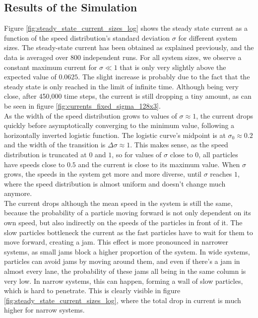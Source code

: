 \subsection{Results of the Simulation}
\label{sec:results_simulation_current_sigma_size}
Figure \ref{fig:steady_state_current_sizes_log} shows the steady state current as a function of the speed distribution's standard deviation $\sigma$ for different system sizes. The steady-state current has been obtained as explained previously, and the data is averaged over 800 independent runs. For all system sizes, we observe a constant maximum current for $\sigma \ll 1$ that is only very slightly above the expected value of $0.0625$. The slight increase is probably due to the fact that the steady state is only reached in the limit of infinite time. Although being very close, after 450,000 time steps, the current is still dropping a tiny amount, as can be seen in figure \ref{fig:currents_fixed_sigma_128x3}. 
\\
As the width of the speed distribution grows to values of $\sigma \approx 1$, the current drops quickly before asymptotically converging to the minimum value, following a horizontally inverted logistic function. The logistic curve's midpoint is at $\sigma_0 \approx 0.2$ and the width of the transition is $\Delta \sigma \approx 1$. This makes sense, as the speed distribution is truncated at $0$ and $1$, so for values of $\sigma$ close to $0$, all particles have speeds close to $0.5$ and the current is close to its maximum value. When $\sigma$ grows, the speeds in the system get more and more diverse, until $\sigma$ reaches $1$, where the speed distribution is almost uniform and doesn't change much anymore. 
\\
The current drops although the mean speed in the system is still the same, because the probability of a particle moving forward is not only dependent on its own speed, but also indirectly on the speeds of the particles in front of it. The slow particles bottleneck the current as the fast particles have to wait for them to move forward, creating a jam. This effect is more pronounced in narrower systems, as small jams block a higher proportion of the system. In wide systems, particles can avoid jams by moving around them, and even if there's a jam in almost every lane, the probability of these jams all being in the same column is very low. In narrow systems, this can happen, forming a wall of slow particles, which is hard to penetrate. This is clearly visible in figure \ref{fig:steady_state_current_sizes_log}, where the total drop in current is much higher for narrow systems. 


